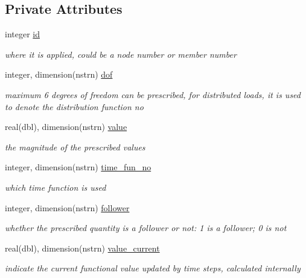 \subsection*{Private Attributes}
\begin{DoxyCompactItemize}
\item 
integer \hyperlink{structprescribedcondition_1_1prescriinf_ad7a7ffe265b06ff7c2a1487bb0b9cf56}{id}
\begin{DoxyCompactList}\small\item\em where it is applied, could be a node number or member number \end{DoxyCompactList}\item 
integer, dimension(nstrn) \hyperlink{structprescribedcondition_1_1prescriinf_add1a1e3ab7bef3eaf011f074368c89f8}{dof}
\begin{DoxyCompactList}\small\item\em maximum 6 degrees of freedom can be prescribed, for distributed loads, it is used to denote the distribution function no \end{DoxyCompactList}\item 
real(dbl), dimension(nstrn) \hyperlink{structprescribedcondition_1_1prescriinf_a42fcd5b12e0a171e60ddf14041ab09aa}{value}
\begin{DoxyCompactList}\small\item\em the magnitude of the prescribed values \end{DoxyCompactList}\item 
integer, dimension(nstrn) \hyperlink{structprescribedcondition_1_1prescriinf_afebb4f4446a4d4877901b4d777af811a}{time\+\_\+fun\+\_\+no}
\begin{DoxyCompactList}\small\item\em which time function is used \end{DoxyCompactList}\item 
integer, dimension(nstrn) \hyperlink{structprescribedcondition_1_1prescriinf_a7e97cae9888b22f4229b56b3a0d2e3b1}{follower}
\begin{DoxyCompactList}\small\item\em whether the prescribed quantity is a follower or not\+: 1 is a follower; 0 is not \end{DoxyCompactList}\item 
real(dbl), dimension(nstrn) \hyperlink{structprescribedcondition_1_1prescriinf_adb8c3bfd5669cc2eccb447f24556ebaf}{value\+\_\+current}
\begin{DoxyCompactList}\small\item\em indicate the current functional value updated by time steps, calculated internally \end{DoxyCompactList}\end{DoxyCompactItemize}


